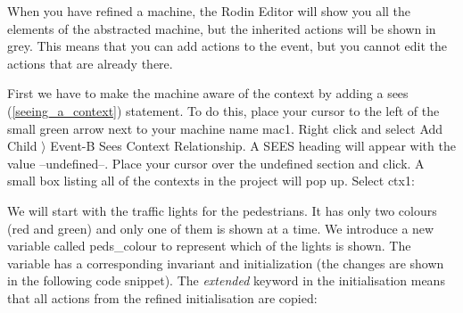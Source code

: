 When you have refined a machine, the Rodin Editor will show you all the elements of the abstracted machine, but the inherited actions will be shown in grey. This means that you can add actions to the event, but you cannot edit the actions that are already there.





First we have to make the machine aware of the context by adding a \textsf{sees} (\ref{seeing_a_context}) statement. To do this, place your cursor to the left of the small green arrow next to your machine name \textsf{mac1}. Right click and select \textsf{Add Child $\rangle$ Event-B Sees Context Relationship}. A \textsf{SEES} heading will appear with the value \textsf{--undefined--}. Place your cursor over the undefined section and click. A small box listing all of the contexts in the project will pop up. Select \textsf{ctx1}:


We will start with the traffic lights for the pedestrians. It has only two colours (red and green) and only one of them is shown at a time.  We introduce a new variable called \textsf{peds\_colour} to represent which of the lights is shown. The variable has a corresponding invariant and initialization (the changes are shown in the following code snippet). The \textit{extended}	keyword in the initialisation means that all
actions from the refined initialisation are copied:


